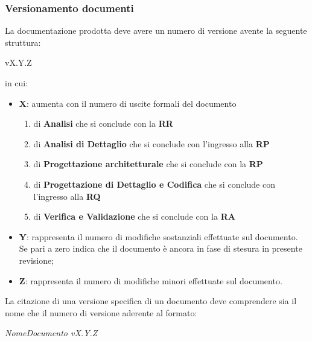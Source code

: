 \documentclass{scalatekids-article}
\begin{document}
\subsubsection{Versionamento documenti}
La documentazione prodotta deve avere un numero di versione avente la seguente struttura:\\
\begin{center}
  vX.Y.Z
\end{center}
in cui:
\begin{itemize}
\item \textbf{X}: aumenta con il numero di uscite formali del documento
  \begin{enumerate}
  \item {} di \textbf{Analisi} che si conclude con la \textbf{RR}
  \item {} di \textbf{Analisi di Dettaglio} che si conclude con l'ingresso alla \textbf{RP}
  \item {} di \textbf{Progettazione architetturale} che si conclude con la \textbf{RP}
  \item {} di \textbf{Progettazione di Dettaglio e Codifica} che si conclude con l'ingresso alla \textbf{RQ}
  \item {} di \textbf{Verifica e Validazione} che si conclude con la \textbf{RA}
  \end{enumerate}
\item \textbf{Y}: rappresenta il numero di modifiche sostanziali effettuate sul documento. Se pari a zero indica che il documento è ancora in fase di stesura in presente revisione;
\item \textbf{Z}: rappresenta il numero di modifiche minori effettuate sul documento.
\end{itemize}
La citazione di una versione specifica di un documento deve comprendere sia il nome che il numero di versione aderente al formato:
\begin{center}
  \textit{NomeDocumento vX.Y.Z}
\end{center}
\end{document}
